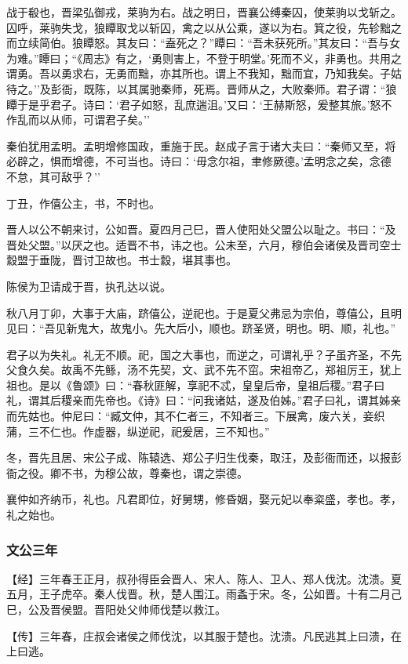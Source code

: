 \documentclass[]{article}
\begin{document}
战于殽也，晋梁弘御戎，莱驹为右。战之明日，晋襄公缚秦囚，使莱驹以戈斩之。囚呼，莱驹失戈，狼瞫取戈以斩囚，禽之以从公乘，遂以为右。箕之役，先轸黜之而立续简伯。狼瞫怒。其友曰：``盍死之？''瞫曰：``吾未获死所。''其友曰：``吾与女为难。''瞫曰；``《周志》有之，`勇则害上，不登于明堂。'死而不义，非勇也。共用之谓勇。吾以勇求右，无勇而黜，亦其所也。谓上不我知，黜而宜，乃知我矣。子姑待之。''及彭衙，既陈，以其属驰秦师，死焉。晋师从之，大败秦师。君子谓：``狼瞫于是乎君子。诗曰：`君子如怒，乱庶遄沮。'又曰：`王赫斯怒，爰整其旅。'怒不作乱而以从师，可谓君子矣。''

秦伯犹用孟明。孟明增修国政，重施于民。赵成子言于诸大夫曰：``秦师又至，将必辟之，惧而增德，不可当也。诗曰：`毋念尔祖，聿修厥德。'孟明念之矣，念德不怠，其可敌乎？''

丁丑，作僖公主，书，不时也。

晋人以公不朝来讨，公如晋。夏四月己巳，晋人使阳处父盟公以耻之。书曰：``及晋处父盟。''以厌之也。适晋不书，讳之也。公未至，六月，穆伯会诸侯及晋司空士縠盟于垂陇，晋讨卫故也。书士縠，堪其事也。

陈侯为卫请成于晋，执孔达以说。

秋八月丁卯，大事于大庙，跻僖公，逆祀也。于是夏父弗忌为宗伯，尊僖公，且明见曰：``吾见新鬼大，故鬼小。先大后小，顺也。跻圣贤，明也。明、顺，礼也。''

君子以为失礼。礼无不顺。祀，国之大事也，而逆之，可谓礼乎？子虽齐圣，不先父食久矣。故禹不先鲧，汤不先契，文、武不先不窋。宋祖帝乙，郑祖厉王，犹上祖也。是以《鲁颂》曰：``春秋匪解，享祀不忒，皇皇后帝，皇祖后稷。''君子曰礼，谓其后稷亲而先帝也。《诗》曰：``问我诸姑，遂及伯姊。''君子曰礼，谓其姊亲而先姑也。仲尼曰：``臧文仲，其不仁者三，不知者三。下展禽，废六关，妾织蒲，三不仁也。作虚器，纵逆祀，祀爰居，三不知也。''

冬，晋先且居、宋公子成、陈辕选、郑公子归生伐秦，取汪，及彭衙而还，以报彭衙之役。卿不书，为穆公故，尊秦也，谓之崇德。

襄仲如齐纳币，礼也。凡君即位，好舅甥，修昏姻，娶元妃以奉粢盛，孝也。孝，礼之始也。

\hypertarget{header-n1077}{%
\subsubsection{文公三年}\label{header-n1077}}

【经】三年春王正月，叔孙得臣会晋人、宋人、陈人、卫人、郑人伐沈。沈溃。夏五月，王子虎卒。秦人伐晋。秋，楚人围江。雨螽于宋。冬，公如晋。十有二月己巳，公及晋侯盟。晋阳处父帅师伐楚以救江。

【传】三年春，庄叔会诸侯之师伐沈，以其服于楚也。沈溃。凡民逃其上曰溃，在上曰逃。
\end{document}
